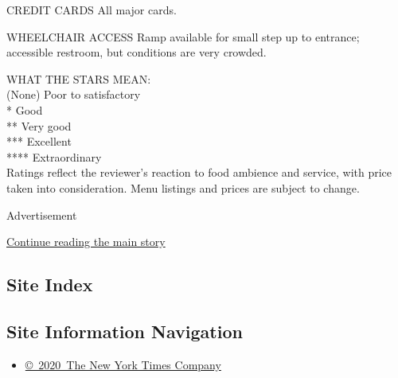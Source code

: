 CREDIT CARDS All major cards.

WHEELCHAIR ACCESS Ramp available for small step up to entrance;
accessible restroom, but conditions are very crowded.

WHAT THE STARS MEAN:\\
(None) Poor to satisfactory\\
* Good\\
** Very good\\
*** Excellent\\
**** Extraordinary\\
Ratings reflect the reviewer's reaction to food ambience and service,
with price taken into consideration. Menu listings and prices are
subject to change.

Advertisement

\protect\hyperlink{after-bottom}{Continue reading the main story}

\hypertarget{site-index}{%
\subsection{Site Index}\label{site-index}}

\hypertarget{site-information-navigation}{%
\subsection{Site Information
Navigation}\label{site-information-navigation}}

\begin{itemize}
\tightlist
\item
  \href{https://help.nytimes3xbfgragh.onion/hc/en-us/articles/115014792127-Copyright-notice}{©~2020~The
  New York Times Company}
\end{itemize}

